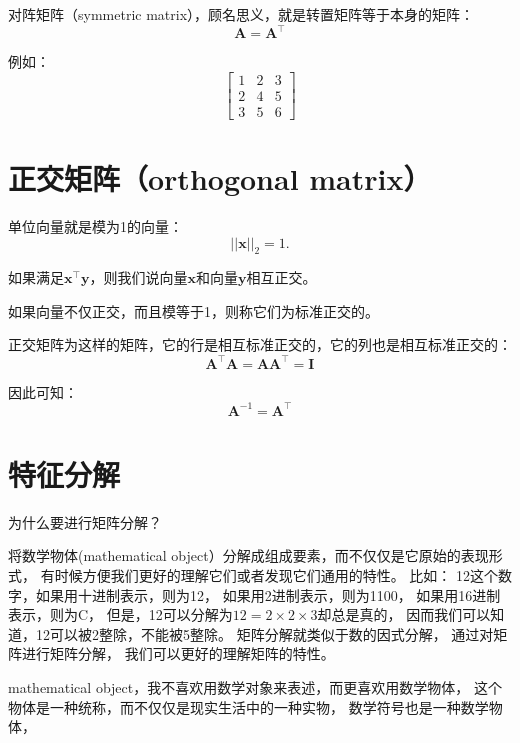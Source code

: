 对阵矩阵（symmetric matrix），顾名思义，就是转置矩阵等于本身的矩阵：
\begin{equation}
  \bm{A} = \bm{A}^\top
\end{equation}

例如：
\begin{equation}
  \begin{bmatrix}
    1 & 2 & 3 \\
    2 & 4 & 5 \\
    3 & 5 & 6
  \end{bmatrix}
\end{equation}

\section{正交矩阵（orthogonal matrix）}

单位向量就是模为1的向量：
\begin{equation}
  ||\bm{x}||_2 = 1.
\end{equation}


如果满足$\bm{x}^\top\bm{y}$，则我们说向量$\bm{x}$和向量$\bm{y}$相互正交。

如果向量不仅正交，而且模等于1，则称它们为标准正交的。


正交矩阵为这样的矩阵，它的行是相互标准正交的，它的列也是相互标准正交的：
\begin{equation}
  \label{eq:orthogonal-matrix}
  \bm{A}^\top \bm{A} = \bm{AA}^\top = \bm{I}
\end{equation}

因此可知：
\begin{equation}
  \bm{A}^{-1} = \bm{A}^\top
\end{equation}

\section{特征分解}

为什么要进行矩阵分解？

将数学物体(mathematical object）分解成组成要素，而不仅仅是它原始的表现形式，
有时候方便我们更好的理解它们或者发现它们通用的特性。
比如：
12这个数字，如果用十进制表示，则为12，
如果用2进制表示，则为1100，
如果用16进制表示，则为C，
但是，12可以分解为$12 = 2\times 2 \times 3$却总是真的，
因而我们可以知道，12可以被2整除，不能被5整除。
矩阵分解就类似于数的因式分解，
通过对矩阵进行矩阵分解，
我们可以更好的理解矩阵的特性。


\begin{tcolorbox}
  mathematical object，我不喜欢用数学对象来表述，而更喜欢用数学物体，
  这个物体是一种统称，而不仅仅是现实生活中的一种实物，
  数学符号也是一种数学物体，
\end{tcolorbox}

